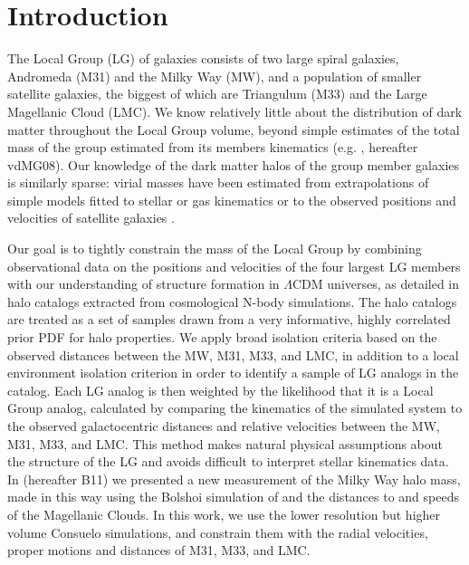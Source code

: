 \documentclass[iop,apj,twocolappendix,numberedappendix]{emulateapj}
\newcommand{\bolshoi}{{\sc Bolshoi }}
\newcommand{\consuelo}{{\sc Consuelo }}
\begin{document}


\section{Introduction}
\label{sec:intro}

The Local Group (LG) of galaxies consists of two large spiral galaxies,
Andromeda (M31) and the Milky Way (MW), and a population of smaller
satellite galaxies, the biggest of which are Triangulum (M33) and the Large Magellanic Cloud (LMC). We know
relatively little about the distribution of dark matter throughout the Local
Group volume, beyond simple estimates of the total mass of the group
estimated from its members kinematics (e.g. \citealt{VdM08}, hereafter vdMG08).
Our knowledge of the dark matter halos of the group member galaxies is
similarly sparse: virial masses have been estimated from extrapolations of
simple models fitted to stellar or gas kinematics  \citep[e.g.][]{xue2008} or to the observed positions and velocities of satellite galaxies \citep[e.g.][]{watkins2010}. 

Our goal is to tightly constrain the mass of the Local Group by combining observational data on the  positions and velocities of the four largest LG members with our understanding of structure formation
in $\Lambda$CDM universes, as detailed in halo catalogs extracted from
cosmological N-body simulations. The halo catalogs are treated as a set of samples
drawn from a very informative, highly correlated prior PDF for halo properties. 
We apply broad isolation criteria based on the observed distances between the MW, M31, M33, and LMC, 
in addition to a local environment isolation criterion in order to identify a sample of LG analogs in the catalog.
Each LG analog is then weighted by the likelihood that it is a Local Group analog, 
calculated by comparing the kinematics of the simulated system to the observed galactocentric distances and relative velocities between the MW, M31, M33, and LMC.
 This method makes natural physical assumptions about the structure of the LG and avoids difficult to interpret stellar kinematics data.  In \cite{busha2011mass} (hereafter B11) we presented a new
measurement of the Milky Way halo mass, made in this way using the
\bolshoi simulation of \citet{Bolshoi} and the distances to and speeds
of the Magellanic Clouds. In this work, we use the lower resolution but
higher volume \consuelo simulations, and constrain them with the radial
velocities, proper motions and distances of M31, M33, and LMC.
\end{document}
